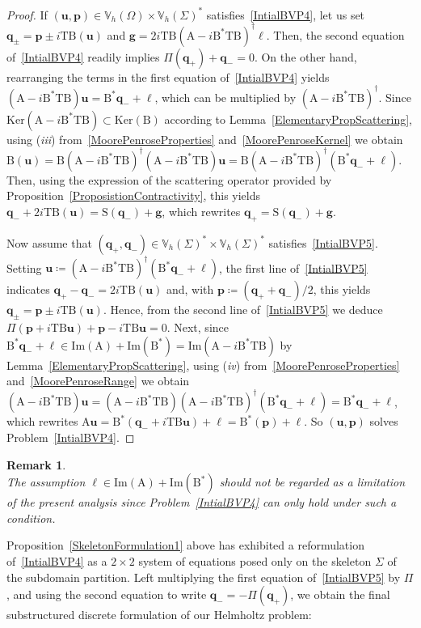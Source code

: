 \documentclass[a4paper,11pt]{article}
\newcommand{\mrm}{\mathrm}
\newcommand{\mA}{\mathrm{A}}
\newcommand{\mB}{\mathrm{B}}
\newcommand{\mT}{\mathrm{T}}
\newcommand{\mS}{\mathrm{S}}
\newcommand{\mbV}{\mathbb{V}}
\newcommand{\bell}{\boldsymbol{\ell}}
\newcommand{\bp}{\boldsymbol{p}}
\newcommand{\bu}{\boldsymbol{u}}
\newcommand{\bq}{\boldsymbol{q}}
\newcommand{\bfg}{\mathbf{g}}
\newtheorem{rem}[defn]{Remark}
\begin{document}
\begin{proof}
If $(\bu,\bp)\in \mbV_h(\Omega)\times\mbV_h(\Sigma)^*$ satisfies~\eqref{IntialBVP4}, let us set $\bq_{\pm} = \bp\pm
i\mT\mB(\bu)$ and $\bfg = 2i\mT\mB(\mA-i\mB^*\mT\mB)^{\dagger}\bell$.
Then, the second equation of~\eqref{IntialBVP4} readily implies
$\Pi(\bq_+)+\bq_- = 0$. On the other hand, rearranging the terms
in the first equation of~\eqref{IntialBVP4} yields
$(\mA-i\mB^*\mT\mB)\bu = \mB^{*}\bq_- + \bell$, which can be
multiplied by $(\mA-i\mB^*\mT\mB)^{\dagger}$. Since $\mrm{Ker}(\mA-i\mB^*\mT\mB)\subset
\mrm{Ker}(\mB)$ according to Lemma~\ref{ElementaryPropScattering}, using (\textit{iii}) from~\eqref{MoorePenroseProperties} and~\eqref{MoorePenroseKernel} we
obtain $\mB(\bu)= \mB(\mA-i\mB^*\mT\mB)^{\dagger}(\mA-i\mB^*\mT\mB)\bu
= \mB(\mA-i\mB^*\mT\mB)^{\dagger}(\mB^{*}\bq_-+\bell)$. Then,
using the expression of the scattering operator provided by
Proposition~\ref{ProposistionContractivity}, this yields
$\bq_-+2i\mT\mB(\bu) = \mS(\bq_-)+\bfg$, which rewrites $\bq_+
= \mS(\bq_-)+\bfg$.

Now assume that $(\bq_+,\bq_-)\in \mbV_h(\Sigma)^*\times
\mbV_h(\Sigma)^*$ satisfies~\eqref{IntialBVP5}. Setting $\bu \coloneq
(\mA-i\mB^*\mT\mB)^{\dagger}(\mB^*\bq_-+\bell)$, the first line of~\eqref{IntialBVP5} indicates $\bq_+-\bq_- = 2i\mT\mB(\bu)$ and,
with $\bp \coloneq (\bq_++\bq_-)/2$, this yields $\bq_\pm =
\bp\pm i\mT\mB(\bu)$. Hence, from the second line of~\eqref{IntialBVP5} we deduce
$\Pi(\bp+i\mT\mB\bu)+\bp-i\mT\mB\bu = 0$. Next, since
$\mB^{*}\bq_-+\bell\in \mrm{Im}(\mA)+\mrm{Im}(\mB^*) =
\mrm{Im}(\mA-i\mB^*\mT\mB)$ by Lemma~\ref{ElementaryPropScattering}, using (\textit{iv}) from~\eqref{MoorePenroseProperties} and~\eqref{MoorePenroseRange} we obtain $(\mA-i\mB^*\mT\mB)\bu =
(\mA-i\mB^*\mT\mB)(\mA-i\mB^*\mT\mB)^{\dagger}(\mB^*\bq_-+\bell) =
\mB^*\bq_-+\bell$, which rewrites $\mA\bu =
\mB^*(\bq_-+i\mT\mB\bu)+\bell = \mB^*(\bp)+\bell$.
So $(\bu,\bp)$ solves Problem~\eqref{IntialBVP4}. 
\end{proof}

\begin{rem}\quad\\
  The assumption $\bell \in\mrm{Im}(\mA)+\mrm{Im}(\mB^*)$ should not
  be regarded as a limitation of the present analysis since Problem~\eqref{IntialBVP4} can only hold under such a condition.
\end{rem}

Proposition~\ref{SkeletonFormulation1} above has exhibited a
reformulation of~\eqref{IntialBVP4} as a $2\times 2$ system of
equations posed only on the skeleton $\Sigma$ of the subdomain
partition. Left multiplying the first equation of~\eqref{IntialBVP5}
by $\Pi$, and using the second equation to write $\bq_- = -\Pi(\bq_+)$,
we obtain the final substructured discrete formulation of our Helmholtz problem: 
\end{document}
